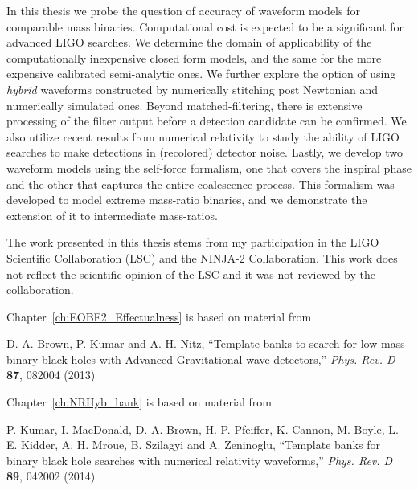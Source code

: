 \documentclass[12pt,notitlepage]{report}
\begin{document}
{In this thesis we probe the question of accuracy of waveform models for 
comparable mass binaries. Computational cost is expected to be a significant
for advanced LIGO searches. We determine the domain of applicability of the
computationally inexpensive closed form models, and the same for the more 
expensive calibrated semi-analytic ones. We further explore the option of 
using {\it hybrid} waveforms constructed by numerically stitching post 
Newtonian and numerically simulated ones. Beyond matched-filtering, there 
is extensive processing of the filter output before a detection candidate can
be confirmed. We also utilize recent results from numerical relativity to study
the ability of LIGO searches to make detections in (recolored) detector noise.
Lastly, we develop two waveform models using the self-force formalism, one 
that covers the inspiral phase and the other that captures the entire 
coalescence process. This formalism was developed to model extreme mass-ratio
binaries, and we demonstrate the extension of it to intermediate mass-ratios.

}
\beforepreface
{}
The work presented in this thesis stems from my participation in the
LIGO Scientific Collaboration (LSC) and the NINJA-2 Collaboration.  This
work does not reflect the scientific opinion of the LSC and it was not
reviewed by the collaboration.

\vspace*{0.5cm}

\noindent Chapter~\ref{ch:EOBF2_Effectualness} is based on material from

\vspace*{0.25cm}

\noindent D. A. Brown, P. Kumar and A. H. Nitz, ``Template banks to 
search for low-mass binary black holes with Advanced Gravitational-wave 
detectors,''
{\it Phys. Rev. D} {\bf 87}, 082004 (2013)

\vspace*{0.5cm}

\noindent Chapter~\ref{ch:NRHyb_bank} is based on material from

\vspace*{0.25cm}

\noindent P. Kumar, I. MacDonald, D. A. Brown, H. P. Pfeiffer, K. Cannon,
M. Boyle, L. E. Kidder, A. H. Mroue, B. Szilagyi and A. Zeninoglu, 
``Template banks for binary black hole searches with numerical relativity
waveforms,''
{\it Phys. Rev. D} {\bf 89}, 042002 (2014)

\vspace*{0.5cm}
\end{document}
